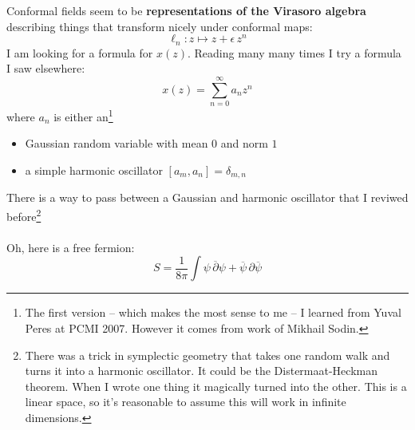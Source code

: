 \documentclass[12pt]{article}
\begin{document}
\newpage

\noindent Conformal fields seem to be \textbf{representations of the Virasoro algebra} describing things that transform nicely under conformal maps:
$$ \ell_n: z \mapsto z + \epsilon \, z^n $$
I am looking for a formula for $x(z)$.  Reading many many times I try a formula I saw elsewhere:
$$ x(z) = \sum_{n = 0}^\infty a_n z^n $$
where $a_n$ is either an\footnote{The first version -- which makes the most sense to me -- I learned from Yuval Peres at PCMI 2007.  However it comes from work of Mikhail Sodin.}
\begin{itemize}
\item Gaussian random variable with mean 0 and norm $1$
\item a simple harmonic oscillator $[a_m, a_n] = \delta_{m, n}$
\end{itemize}
There is a way to pass between a Gaussian and harmonic oscillator that I reviwed before\footnote{There was a trick in symplectic geometry that takes one random walk and turns it into a harmonic oscillator. It could be the Distermaat-Heckman theorem.  When I wrote one thing it magically turned into the other.  This is a linear space, so it's reasonable to assume this will work in infinite dimensions.  } \\ \\
Oh, here is a free fermion:
$$ S = \frac{1}{8\pi} \int \psi \,\overline{\partial}\psi + \overline{\psi} \,\partial \overline{\psi} $$


\newpage
\end{document}

